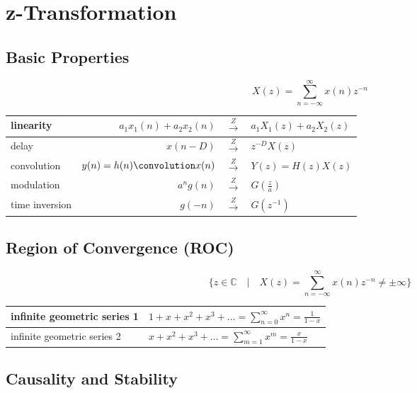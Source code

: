 \section{z-Transformation}

\subsection{Basic Properties}

\[
	X(z) = \sum\limits_{n=-\infty}^\infty x(n)z^{-n}
\]

\begin{tabularx}{0.6\textwidth}{|l|r>{\centering}Xl|}
	\hline
	linearity & $a_1x_1(n) + a_2x_2(n)$ & $\overset{Z}{\longrightarrow}$ & $a_1X_1(z) + a_2X_2(z)$
	\\ \hline
	delay	& $x(n-D)$ & $\overset{Z}{\longrightarrow}$ & $z^{-D}X(z)$
	\\ \hline
	convolution & $y(n) = h(n) \convolution x(n)$ & $\overset{Z}{\longrightarrow}$ & $Y(z) = H(z)X(z)$
	\\ \hline
	modulation & $a^n g(n)$ & $\overset{Z}{\longrightarrow}$ & $G(\frac{z}{a})$
	\\ \hline
	time inversion & $g(-n)$ & $\overset{Z}{\longrightarrow}$ & $G(z^{-1})$
	\\ \hline
\end{tabularx}


\subsection{Region of Convergence (ROC)}

\[
	\{ z \in \mathbb{C} \quad | \quad X(z) = \sum\limits_{n=-\infty}^{\infty} x(n)z^{-n} \neq \pm \infty \}
\]

\label{geometricseries}
\begin{tabularx}{0.6\textwidth}{|l|X|}
	\hline
	infinite geometric series 1 & $1 + x + x^2 + x^3 + \ldots = \sum\limits_{n=0}^{\infty} x^n = \frac{1}{1-x}$
	\\ \hline
	infinite geometric series 2 & $x + x^2 + x^3 + \ldots = \sum\limits_{m=1}^{\infty} x^m = \frac{x}{1-x}$
	\\ \hline
\end{tabularx}


\subsection{Causality and Stability}

